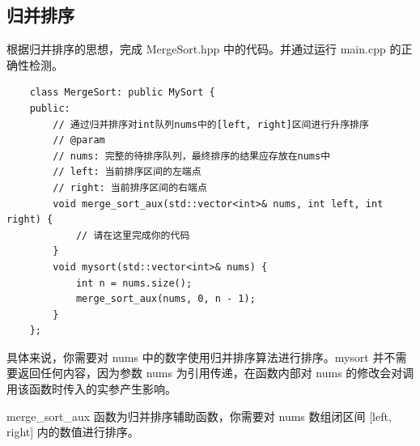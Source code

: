 \documentclass{article}
\begin{document}
\subsection{归并排序}

根据归并排序的思想，完成 MergeSort.hpp 中的代码。并通过运行 main.cpp 的正确性检测。

\begin{lstlisting}
    class MergeSort: public MySort {
    public:
        // 通过归并排序对int队列nums中的[left, right]区间进行升序排序
        // @param
        // nums: 完整的待排序队列，最终排序的结果应存放在nums中
        // left: 当前排序区间的左端点
        // right: 当前排序区间的右端点
        void merge_sort_aux(std::vector<int>& nums, int left, int right) {
            // 请在这里完成你的代码
        }
        void mysort(std::vector<int>& nums) {
            int n = nums.size();
            merge_sort_aux(nums, 0, n - 1);
        }
    };
\end{lstlisting}

具体来说，你需要对 nums 中的数字使用归并排序算法进行排序。mysort 并不需要返回任何内容，因为参数 nums 为引用传递，在函数内部对 nums 的修改会对调用该函数时传入的实参产生影响。

merge\_sort\_aux 函数为归并排序辅助函数，你需要对 nums 数组闭区间 [left, right] 内的数值进行排序。
\end{document}
